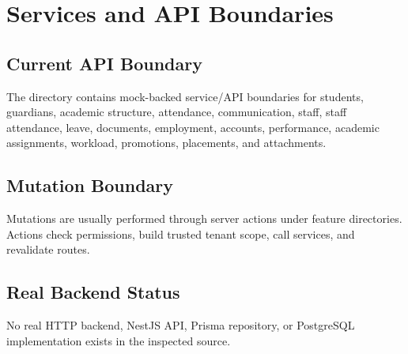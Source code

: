 \chapter{Services and API Boundaries}
\section{Current API Boundary}
The directory  contains mock-backed service/API boundaries for students, guardians, academic structure, attendance, communication, staff, staff attendance, leave, documents, employment, accounts, performance, academic assignments, workload, promotions, placements, and attachments.

\section{Mutation Boundary}
Mutations are usually performed through server actions under feature  directories. Actions check permissions, build trusted tenant scope, call services, and revalidate routes.

\section{Real Backend Status}
\notimplemented{} No real HTTP backend, NestJS API, Prisma repository, or PostgreSQL implementation exists in the inspected source.
